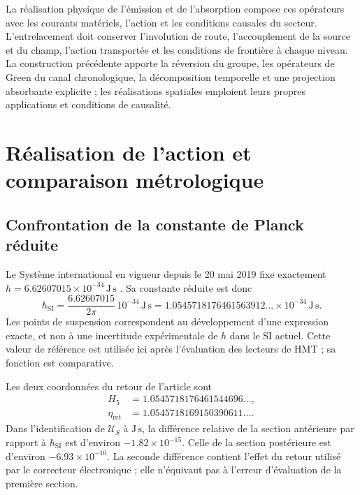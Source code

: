 La réalisation physique de l'émission et de l'absorption compose ces opérateurs avec les courants matériels, l'action et les conditions causales du secteur. L'entrelacement doit conserver l'involution de route, l'accouplement de la source et du champ, l'action transportée et les conditions de frontière à chaque niveau. La construction précédente apporte la réversion du groupe, les opérateurs de Green du canal chronologique, la décomposition temporelle et une projection absorbante explicite ; les réalisations spatiales emploient leurs propres applications et conditions de causalité.


\chapter{Réalisation de l’action et comparaison métrologique}

\section{Confrontation de la constante de Planck réduite}
\label{x_reciprocidad:sec:revision-planck-contraste}

Le Système international en vigueur depuis le 20 mai 2019 fixe
exactement \(h=6.62607015\times10^{-34}\,\mathrm{J\,s}\)
\cite{x_reciprocidad:bipm2018}. Sa constante réduite est donc
\[
 \hbar_{\mathrm{SI}}=\frac{6.62607015}{2\pi}\,10^{-34}\,
 \mathrm{J\,s}
 =1.0545718176461563912\ldots\times10^{-34}\,\mathrm{J\,s}.
\]
Les points de suspension correspondent au développement d'une expression
exacte, et non à une incertitude expérimentale de \(h\) dans le SI actuel.
Cette valeur de référence est utilisée ici après l'évaluation des
lecteurs de HMT ; sa fonction est comparative.

Les deux coordonnées du retour de l'article sont
\begin{align*}
 H_5&=1.0545718176461544696\ldots,\\
 \eta_{\mathrm{ret}}&=1.0545718169150390611\ldots.
\end{align*}
Dans l'identification de \(\mathcal U_S\) à \(\mathrm{J\,s}\), la
différence relative de la section antérieure par rapport à
\(\hbar_{\mathrm{SI}}\) est d'environ \(-1.82\times10^{-15}\).
Celle de la section postérieure est d'environ \(-6.93\times10^{-10}\).
La seconde différence contient l'effet du retour utilisé par le
correcteur électronique ; elle n'équivaut pas à l'erreur d'évaluation de la
première section.


